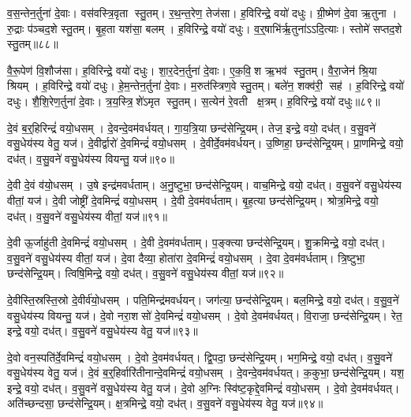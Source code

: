 व॒स॒न्तेन॒र्तुना॑ दे॒वाः। वस॑वस्त्रि॒वृता स्तु॒तम्। र॒थ॒न्त॒रेण॒ तेज॑सा। ह॒विरिन्द्रे॒ वयो॑ दधुः। ग्री॒ष्मेण॑ दे॒वा ऋ॒तुना। रु॒द्राः प॑ञ्चद॒शे स्तु॒तम्। बृ॒ह॒ता यश॑सा॒ बलम्। ह॒विरिन्द्रे॒ वयो॑ दधुः। व॒र्॒षाभि॑र्\mbox{}ऋ॒तुना॑ऽऽदि॒त्याः। स्तोमे॑ सप्तद॒शे स्तु॒तम्॥८८॥

वै॒रू॒पेण॑ वि॒शौज॑सा। ह॒विरिन्द्रे॒ वयो॑ दधुः। शा॒र॒देन॒र्तुना॑ दे॒वाः। ए॒क॒वि॒श ऋ॒भव॑ स्तु॒तम्। वै॒रा॒जेन॑ श्रि॒या श्रियम्। ह॒विरिन्द्रे॒ वयो॑ दधुः। हे॒म॒न्तेन॒र्तुना॑ दे॒वाः। म॒रुत॑स्त्रिण॒वे स्तु॒तम्। बले॑न॒ शक्व॑री॒ सह॑। ह॒विरिन्द्रे॒ वयो॑ दधुः। शै॒शि॒रेण॒र्तुना॑ दे॒वाः। त्र॒य॒स्त्रि॒शे॑ऽमृत स्तु॒तम्। स॒त्येन॑ रे॒वती क्ष॒त्रम्। ह॒विरिन्द्रे॒ वयो॑ दधुः॥८९॥\anuvakamend[स्तोमे॑ सप्तद॒शे स्तु॒त सहो॑ ह॒विरिन्द्रे॒ वयो॑ दधुश्च॒त्वारि॑ च (व॒स॒न्तेन॑ ग्री॒ष्मेण॑ व॒र्‌षाभि॑ शार॒देन॑ हेम॒न्तेन॑ शैशि॒रेण॒ षट् ॥ )]

दे॒वं ब॒र्॒हिरिन्द्रं॑ वयो॒धसम्। दे॒वन्दे॒वम॑वर्धयत्। गा॒य॒त्रि॒या छन्द॑सेन्द्रि॒यम्। तेज॒ इन्द्रे॒ वयो॒ दध॑त्। व॒सु॒वने॑ वसु॒धेय॑स्य वेतु॒ यज॑। दे॒वीर्द्वारो॑ दे॒वमिन्द्रं॑ वयो॒धसम्। दे॒वीर्दे॒वम॑वर्धयन्। उ॒ष्णिहा॒ छन्द॑सेन्द्रि॒यम्। प्रा॒णमिन्द्रे॒ वयो॒ दध॑त्। व॒सु॒वने॑ वसु॒धेय॑स्य वियन्तु॒ यज॑॥९०॥

दे॒वी दे॒वं व॑यो॒धसम्। उ॒षे इन्द्र॑मवर्धताम्। अ॒नु॒ष्टुभा॒ छन्द॑सेन्द्रि॒यम्। वाच॒मिन्द्रे॒ वयो॒ दध॑त्। व॒सु॒वने॑ वसु॒धेय॑स्य वीतां॒ यज॑। दे॒वी जोष्ट्री॑ दे॒वमिन्द्रं॑ वयो॒धसम्। दे॒वी दे॒वम॑वर्धताम्। बृ॒ह॒त्या छन्द॑सेन्द्रि॒यम्। श्रोत्र॒मिन्द्रे॒ वयो॒ दध॑त्। व॒सु॒वने॑ वसु॒धेय॑स्य वीतां॒ यज॑॥९१॥

दे॒वी ऊ॒र्जाहु॑ती दे॒वमिन्द्रं॑ वयो॒धसम्। दे॒वी दे॒वम॑वर्धताम्। प॒ङ्क्त्या छन्द॑सेन्द्रि॒यम्। शु॒क्रमिन्द्रे॒ वयो॒ दध॑त्। व॒सु॒वने॑ वसु॒धेय॑स्य वीतां॒ यज॑। दे॒वा दैव्या॒ होता॑रा दे॒वमिन्द्रं॑ वयो॒धसम्। दे॒वा दे॒वम॑वर्धताम्। त्रि॒ष्टुभा॒ छन्द॑सेन्द्रि॒यम्। त्विषि॒मिन्द्रे॒ वयो॒ दध॑त्। व॒सु॒वने॑ वसु॒धेय॑स्य वीतां॒ यज॑॥९२॥

दे॒वीस्ति॒स्रस्ति॒स्रो दे॒वीर्व॑यो॒धसम्। पति॒मिन्द्र॑मवर्धयन्। जग॑त्या॒ छन्द॑सेन्द्रि॒यम्। बल॒मिन्द्रे॒ वयो॒ दध॑त्। व॒सु॒व॒ने॑ वसु॒धेय॑स्य वियन्तु॒ यज॑। दे॒वो नरा॒शसो॑ दे॒वमिन्द्रं॑ वयो॒धसम्। दे॒वो दे॒वम॑वर्धयत्। वि॒राजा॒ छन्द॑सेन्द्रि॒यम्। रेत॒ इन्द्रे॒ वयो॒ दध॑त्। व॒सु॒वने॑ वसु॒धेय॑स्य वेतु॒ यज॑॥९३॥

दे॒वो वन॒स्पति॑र्दे॒वमिन्द्रं॑ वयो॒धसम्। दे॒वो दे॒वम॑वर्धयत्। द्वि॒पदा॒ छन्द॑सेन्द्रि॒यम्। भग॒मिन्द्रे॒ वयो॒ दध॑त्। व॒सु॒वने॑ वसु॒धेय॑स्य वेतु॒ यज॑। दे॒वं ब॒र्॒हिर्वारि॑तीनान्दे॒वमिन्द्रं॑ वयो॒धसम्। दे॒वन्दे॒वम॑वर्धयत्। क॒कुभा॒ छन्द॑सेन्द्रि॒यम्। यश॒ इन्द्रे॒ वयो॒ दध॑त्। व॒सु॒वने॑ वसु॒धेय॑स्य वेतु॒ यज॑। दे॒वो अ॒ग्निः स्वि॑ष्ट॒कृद्दे॒वमिन्द्रं॑ वयो॒धसम्। दे॒वो दे॒वम॑वर्धयत्। अति॑च्छन्दसा॒ छन्द॑सेन्द्रि॒यम्। क्ष॒त्रमिन्द्रे॒ वयो॒ दध॑त्। व॒सु॒वने॑ वसु॒धेय॑स्य वेतु॒ यज॑॥९४॥

